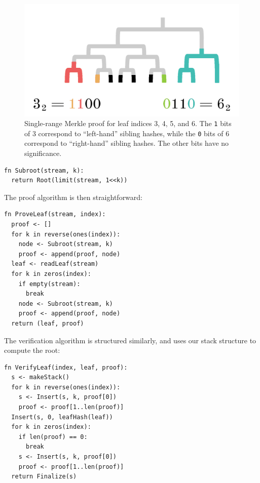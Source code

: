 \documentclass[twocolumn]{article}
\begin{document}
\begin{figure}[t]
\includegraphics[scale=0.24]{range}
\centering
\caption{Single-range Merkle proof for leaf indices 3, 4, 5, and 6. The \texttt{1} bits of 3 correspond to ``left-hand'' sibling hashes, while the \texttt{0} bits of 6 correspond to ``right-hand'' sibling hashes. The other bits have no significance.}
\label{img-range}
\end{figure}


\begin{minipage}[c]{0.95\textwidth}
\begin{lstlisting}
fn Subroot(stream, k):
  return Root(limit(stream, 1<<k))
\end{lstlisting}
\end{minipage}

\noindent The proof algorithm is then straightforward:

\begin{minipage}[c]{0.95\textwidth}
\begin{lstlisting}
fn ProveLeaf(stream, index):
  proof <- []
  for k in reverse(ones(index)):
    node <- Subroot(stream, k)
    proof <- append(proof, node)
  leaf <- readLeaf(stream)
  for k in zeros(index):
    if empty(stream):
      break
    node <- Subroot(stream, k)
    proof <- append(proof, node)
  return (leaf, proof)
\end{lstlisting}
\end{minipage}

\noindent The verification algorithm is structured similarly, and uses our stack structure to compute the root:

\begin{minipage}[c]{0.95\textwidth}
\begin{lstlisting}
fn VerifyLeaf(index, leaf, proof):
  s <- makeStack()
  for k in reverse(ones(index)):
    s <- Insert(s, k, proof[0])
    proof <- proof[1..len(proof)]
  Insert(s, 0, leafHash(leaf))
  for k in zeros(index):
    if len(proof) == 0:
      break
    s <- Insert(s, k, proof[0])
    proof <- proof[1..len(proof)]
  return Finalize(s)

\end{lstlisting}
\end{minipage}
\end{document}

